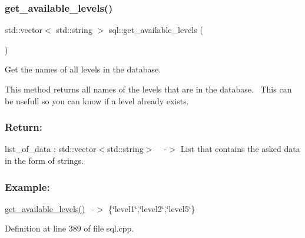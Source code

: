 \subsubsection{\texorpdfstring{get\+\_\+available\+\_\+levels()}{get\_available\_levels()}}
{\footnotesize\ttfamily std\+::vector$<$ std\+::string $>$ sql\+::get\+\_\+available\+\_\+levels (\begin{DoxyParamCaption}{ }\end{DoxyParamCaption})}



Get the names of all levels in the database. 

This method returns all names of the levels that are in the database.~\newline
This can be usefull so you can know if a level already exists. ~\newline


\subsubsection*{Return\+: }

list\+\_\+of\+\_\+data \+: std\+::vector$<$std\+::string$>$ ~\newline
-\/$>$ List that contains the asked data in the form of strings.

\subsubsection*{Example\+: }

\hyperlink{classsql_a29fe43df701460704744049aec28d58e}{get\+\_\+available\+\_\+levels()}~\newline
-\/$>$ \{\char`\"{}level1\char`\"{},\char`\"{}level2\char`\"{},\char`\"{}level5\char`\"{}\} 

Definition at line 389 of file sql.\+cpp.

